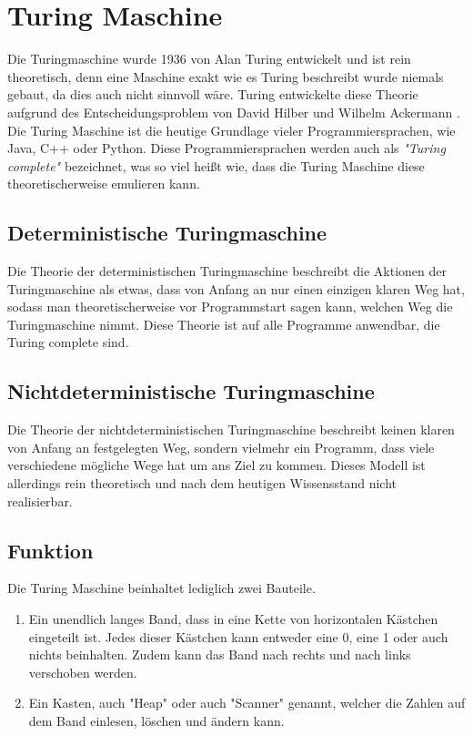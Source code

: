 \section{Turing Maschine}
\label{turingmaschine}
Die Turingmaschine wurde 1936 von Alan Turing entwickelt und ist rein theoretisch, denn eine Maschine exakt wie es Turing beschreibt wurde niemals gebaut, da dies auch nicht sinnvoll wäre. Turing entwickelte diese Theorie aufgrund des Entscheidungsproblem von David Hilber und Wilhelm Ackermann \cite{theessentialturing}. Die Turing Maschine ist die heutige Grundlage vieler Programmiersprachen, wie Java, C++ oder Python. Diese Programmiersprachen werden auch als \textit{"Turing complete"} bezeichnet, was so viel heißt wie, dass die Turing Maschine diese theoretischerweise emulieren kann.

\subsection{Deterministische Turingmaschine}
Die Theorie der deterministischen Turingmaschine beschreibt die Aktionen der Turingmaschine als etwas, dass von Anfang an nur einen einzigen klaren Weg hat, sodass man theoretischerweise vor Programmstart sagen kann, welchen Weg die Turingmaschine nimmt. Diese Theorie ist auf alle Programme anwendbar, die Turing complete sind.

\subsection{Nichtdeterministische Turingmaschine}
Die Theorie der nichtdeterministischen Turingmaschine beschreibt keinen klaren von Anfang an festgelegten Weg, sondern vielmehr ein Programm, dass viele verschiedene mögliche Wege hat um ans Ziel zu kommen. Dieses Modell ist allerdings rein theoretisch und nach dem heutigen Wissensstand nicht realisierbar.

\subsection{Funktion}
Die Turing Maschine beinhaltet lediglich zwei Bauteile.
\begin{enumerate}
	\item  Ein unendlich langes Band, dass in eine Kette von horizontalen Kästchen eingeteilt ist. Jedes dieser Kästchen kann entweder eine 0, eine 1 oder auch nichts beinhalten. Zudem kann das Band nach rechts und nach links verschoben werden.
	\item Ein Kasten, auch "Heap" oder auch "Scanner" genannt, welcher die Zahlen auf dem Band einlesen, löschen und ändern kann.
\end{enumerate}

